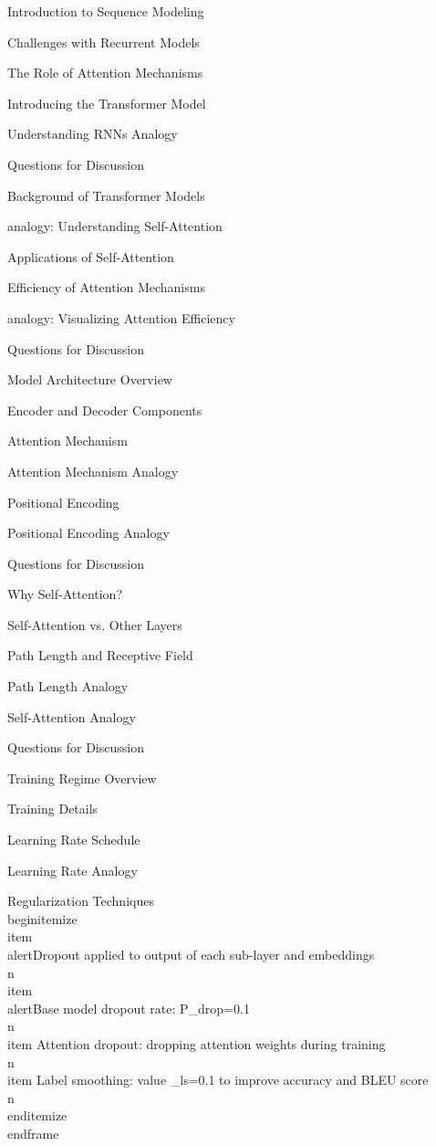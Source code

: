 \documentclass{beamer}
\begin{document}
\begin{frame}[]{Introduction to Sequence Modeling}
\begin{frame}[]{Challenges with Recurrent Models}
\begin{frame}[]{The Role of Attention Mechanisms}
\begin{frame}[]{Introducing the Transformer Model}
\begin{frame}[plain]{Understanding RNNs Analogy}
\begin{frame}[]{Questions for Discussion}
\begin{frame}[]{Background of Transformer Models}
\begin{frame}[plain]{analogy: Understanding Self-Attention}
\begin{frame}[]{Applications of Self-Attention}
\begin{frame}[]{Efficiency of Attention Mechanisms}
\begin{frame}[plain]{analogy: Visualizing Attention Efficiency}
\begin{frame}[]{Questions for Discussion}
\begin{frame}[]{Model Architecture Overview}
\begin{frame}[]{Encoder and Decoder Components}
\begin{frame}[]{Attention Mechanism}
\begin{frame}[plain]{Attention Mechanism Analogy}
\begin{frame}[]{Positional Encoding}
\begin{frame}[plain]{Positional Encoding Analogy}
\begin{frame}[]{Questions for Discussion}
\begin{frame}[]{Why Self-Attention?}
\begin{frame}[]{Self-Attention vs. Other Layers}
\begin{frame}[]{Path Length and Receptive Field}
\begin{frame}[plain]{Path Length Analogy}
\begin{frame}[plain]{Self-Attention Analogy}
\begin{frame}[]{Questions for Discussion}
\begin{frame}[]{Training Regime Overview}
\begin{frame}[]{Training Details}
\begin{frame}[]{Learning Rate Schedule}
\begin{frame}[plain]{Learning Rate Analogy}
\begingroup
{}\n{}\n\begin{frame}[]{Regularization Techniques}\n\\begin{itemize}
\\item \\alert{Dropout applied to output of each sub-layer and embeddings}\\n\\item \\alert{Base model dropout rate: P\_drop=0.1}\\n\\item Attention dropout: dropping attention weights during training\\n\\item Label smoothing: value \_ls=0.1 to improve accuracy and BLEU score\\n\\end{itemize}
\\end{frame}

\endgroup


\end{frame}
\end{frame}
\end{frame}
\end{frame}
\end{frame}
\end{frame}
\end{frame}
\end{frame}
\end{frame}
\end{frame}
\end{frame}
\end{frame}
\end{frame}
\end{frame}
\end{frame}
\end{frame}
\end{frame}
\end{frame}
\end{frame}
\end{frame}
\end{frame}
\end{frame}
\end{frame}
\end{frame}
\end{frame}
\end{frame}
\end{frame}
\end{frame}
\end{frame}
\end{frame}
\end{document}
